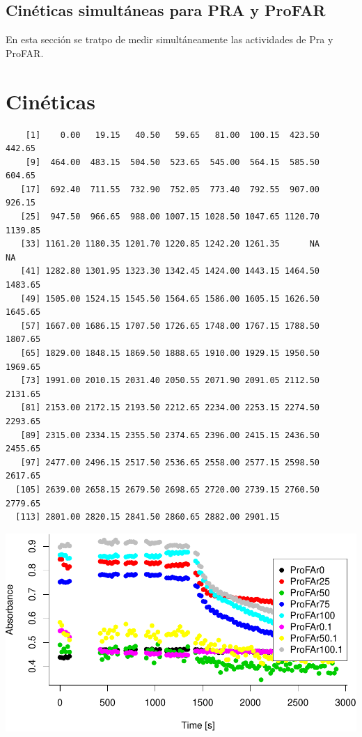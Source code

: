 \documentclass[12pt,twoside]{reedthesis}
\begin{document}
  \clearpage 
  
  \subsection{Cinéticas simultáneas para PRA y
  ProFAR}\label{cineticas-simultaneas-para-pra-y-profar}
  
  En esta sección se tratpo de medir simultáneamente las actividades de
  Pra y ProFAR.
  
  \section{Cinéticas}\label{cineticas}
  
  \begin{verbatim}
    [1]    0.00   19.15   40.50   59.65   81.00  100.15  423.50  442.65
    [9]  464.00  483.15  504.50  523.65  545.00  564.15  585.50  604.65
   [17]  692.40  711.55  732.90  752.05  773.40  792.55  907.00  926.15
   [25]  947.50  966.65  988.00 1007.15 1028.50 1047.65 1120.70 1139.85
   [33] 1161.20 1180.35 1201.70 1220.85 1242.20 1261.35      NA      NA
   [41] 1282.80 1301.95 1323.30 1342.45 1424.00 1443.15 1464.50 1483.65
   [49] 1505.00 1524.15 1545.50 1564.65 1586.00 1605.15 1626.50 1645.65
   [57] 1667.00 1686.15 1707.50 1726.65 1748.00 1767.15 1788.50 1807.65
   [65] 1829.00 1848.15 1869.50 1888.65 1910.00 1929.15 1950.50 1969.65
   [73] 1991.00 2010.15 2031.40 2050.55 2071.90 2091.05 2112.50 2131.65
   [81] 2153.00 2172.15 2193.50 2212.65 2234.00 2253.15 2274.50 2293.65
   [89] 2315.00 2334.15 2355.50 2374.65 2396.00 2415.15 2436.50 2455.65
   [97] 2477.00 2496.15 2517.50 2536.65 2558.00 2577.15 2598.50 2617.65
  [105] 2639.00 2658.15 2679.50 2698.65 2720.00 2739.15 2760.50 2779.65
  [113] 2801.00 2820.15 2841.50 2860.65 2882.00 2901.15
  \end{verbatim}
  
  \begin{center}\includegraphics{tesis_files/figure-latex/Cinetics-1} \end{center}
  
\end{document}
